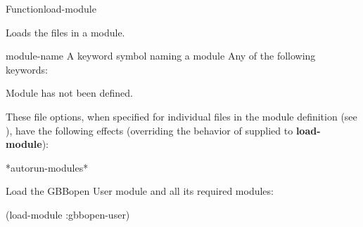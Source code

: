 \documentclass[10pt,twoside,english,pdftex]{article}
\begin{document}
\begin{functiondoc}{Function}{load-module}{
     }
%
% 

\fnsyntax 

\fnpurpose Loads the files in a module.

\fnpackage {}

\fnmodule {}

\fnargs
\begin{args}{module-name}
 A keyword symbol naming a module 
\arg[option] Any of the following keywords: 
\loadmoduleoptions
\end{args}

\fnerrors Module  has not been defined.

\fndescription These file options, when specified for individual files in the
module definition (see \textbf{}), have the
following effects (overriding the behavior of  supplied to
\textbf{load-module}):
\loadmodulefileoptions

\begin{alsos}{*autorun-modules*}
\end{alsos}

\fnexample Load the GBBopen User module and all its required modules:
\begin{example}
  (load-module :gbbopen-user)
\end{example}

\end{functiondoc}

\end{document}
